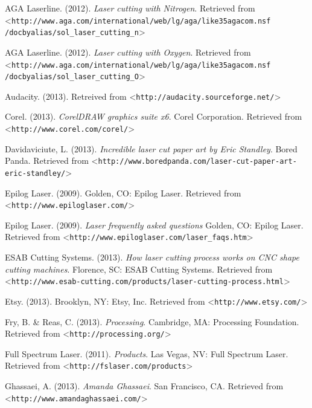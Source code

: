 \documentclass[12pt singlecol]{article}
\begin{document}
\begin{flushleft}
\begin{thebibliography}{99\kern\bibindent}
	 AGA Laserline. (2012). \emph{Laser cutting with Nitrogen}. Retrieved from \textless\texttt{http://www.aga.com/international/web/lg/aga/like35agacom.nsf\\/docbyalias/sol\_laser\_cutting\_n}\textgreater

	 AGA Laserline. (2012). \emph{Laser cutting with Oxygen}. Retrieved from \textless\texttt{http://www.aga.com/international/web/lg/aga/like35agacom.nsf\\/docbyalias/sol\_laser\_cutting\_O}\textgreater

	 Audacity. (2013). Retreived from \textless\texttt{http://audacity.sourceforge.net/}\textgreater

	 Corel. (2013). \emph{CorelDRAW graphics suite x6}. Corel Corporation. Retrieved from \textless\texttt{http://www.corel.com/corel/}\textgreater

	 Davidaviciute, L. (2013). \emph{Incredible laser cut paper art by Eric Standley}. Bored Panda. Retrieved from \textless\texttt{http://www.boredpanda.com/laser-cut-paper-art-eric-standley/}\textgreater

	 Epilog Laser. (2009). Golden, CO: Epilog Laser. Retrieved from \textless\texttt{http://www.epiloglaser.com/}\textgreater

	 Epilog Laser. (2009). \emph{Laser frequently asked questions} Golden, CO: Epilog Laser. Retrieved from \textless\texttt{http://www.epiloglaser.com/laser\_faqs.htm}\textgreater

	 ESAB Cutting Systems. (2013). \emph{How laser cutting process works on CNC shape cutting machines}. Florence, SC: ESAB Cutting Systems. Retrieved from \textless\texttt{http://www.esab-cutting.com/products/laser-cutting-process.html}\textgreater

	 Etsy. (2013). Brooklyn, NY: Etsy, Inc. Retrieved from \textless\texttt{http://www.etsy.com/}\textgreater

	 Fry, B. \& Reas, C. (2013). \emph{Processing}. Cambridge, MA: Processing Foundation. Retrieved from \textless\texttt{http://processing.org/}\textgreater

	 Full Spectrum Laser. (2011). \emph{Products}. Las Vegas, NV: Full Spectrum Laser. Retrieved from \textless\texttt{http://fslaser.com/products}\textgreater

	 Ghassaei, A. (2013). \emph{Amanda Ghassaei}. San Francisco, CA. Retrieved from \textless\texttt{http://www.amandaghassaei.com/}\textgreater


\end{thebibliography}
\end{flushleft}
\end{document}
